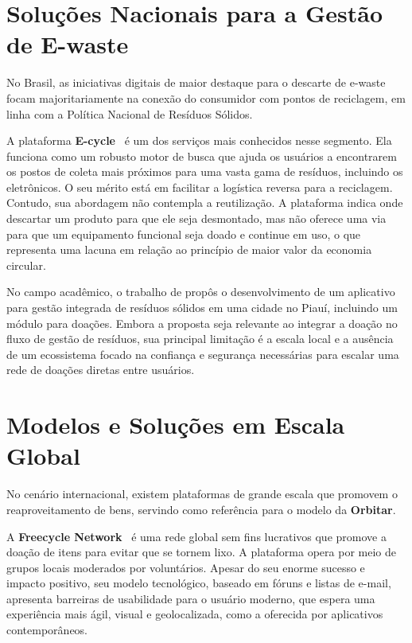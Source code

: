 \documentclass[
	12pt,				%
	openright,			%
	oneside,			%
	a4paper,			%
	english,			%
	brazil				%
	]{abntex2}
\theoremstyle{definition}
\begin{document}
\section{Soluções Nacionais para a Gestão de E-waste}

No Brasil, as iniciativas digitais de maior destaque para o descarte de e-waste focam majoritariamente na conexão do consumidor com pontos de reciclagem, em linha com a Política Nacional de Resíduos Sólidos.

A plataforma \textbf{E-cycle}~\cite{E-cycle} é um dos serviços mais conhecidos nesse segmento. Ela funciona como um robusto motor de busca que ajuda os usuários a encontrarem os postos de coleta mais próximos para uma vasta gama de resíduos, incluindo os eletrônicos. O seu mérito está em facilitar a logística reversa para a reciclagem. Contudo, sua abordagem não contempla a reutilização. A plataforma indica onde descartar um produto para que ele seja desmontado, mas não oferece uma via para que um equipamento funcional seja doado e continue em uso, o que representa uma lacuna em relação ao princípio de maior valor da economia circular.

No campo acadêmico, o trabalho de \cite{SilvaNeto2020} propôs o desenvolvimento de um aplicativo para gestão integrada de resíduos sólidos em uma cidade no Piauí, incluindo um módulo para doações. Embora a proposta seja relevante ao integrar a doação no fluxo de gestão de resíduos, sua principal limitação é a escala local e a ausência de um ecossistema focado na confiança e segurança necessárias para escalar uma rede de doações diretas entre usuários.

\section{Modelos e Soluções em Escala Global}

No cenário internacional, existem plataformas de grande escala que promovem o reaproveitamento de bens, servindo como referência para o modelo da \textbf{Orbitar}.

A \textbf{Freecycle Network}~\cite{Freecycle} é uma rede global sem fins lucrativos que promove a doação de itens para evitar que se tornem lixo. A plataforma opera por meio de grupos locais moderados por voluntários. Apesar do seu enorme sucesso e impacto positivo, seu modelo tecnológico, baseado em fóruns e listas de e-mail, apresenta barreiras de usabilidade para o usuário moderno, que espera uma experiência mais ágil, visual e geolocalizada, como a oferecida por aplicativos contemporâneos.
\end{document}

